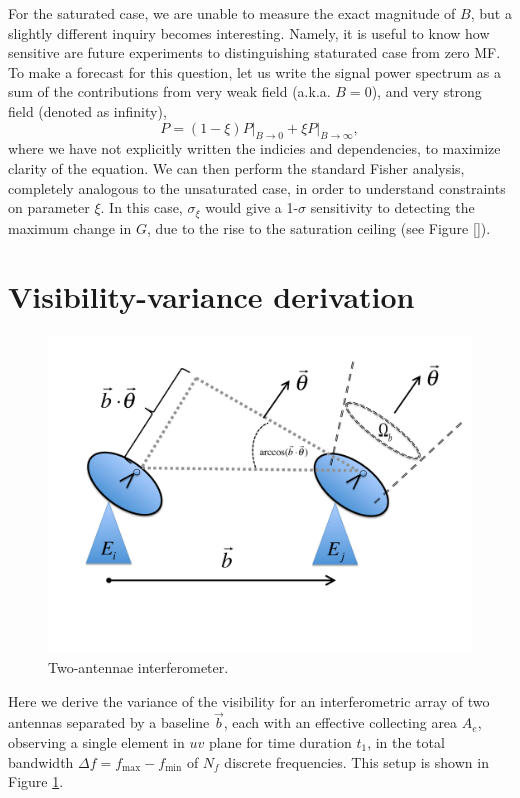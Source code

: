 \documentclass[12pt]{paper}
\newcommand{\beq}{\begin{equation}}
\newcommand{\eeq}{\end{equation}}
\begin{document}
For the saturated case, we are unable to measure the exact magnitude of $B$, but a slightly different inquiry becomes interesting. Namely, it is useful to know how sensitive are future experiments to distinguishing staturated case from zero MF. To make a forecast for this question, let us write the signal power spectrum as a sum of the contributions from very weak field (a.k.a. $B=0$), and very strong field (denoted as infinity), 
\beq
P = (1-\xi)P\bigg|_{B\to 0} + \xi P\bigg|_{B\to \infty},
\label{eq:saturated_P}
\eeq
where we have not explicitly written the indicies and dependencies, to maximize clarity of the equation. We can then perform the standard Fisher analysis, completely analogous to the unsaturated case, in order to understand constraints on parameter $\xi$. In this case, $\sigma_\xi$ would give a 1-$\sigma$ sensitivity to detecting the maximum change in $G$, due to the rise to the saturation ceiling (see Figure \ref{}). 

\appendix
\section{Visibility-variance derivation}
\label{app_Vrms}

\begin{figure}
\centering
\includegraphics[width=.5\textwidth,keepaspectratio=true]{2antennae.pdf}
\caption{Two-antennae interferometer.\label{fig:2antennae}}
\end{figure}

Here we derive the variance of the visibility for an interferometric array of two antennas separated by a baseline $\vec{b}$, each with an effective collecting area $A_e$, observing a single element in $uv$ plane for time duration $t_1$, in the total bandwidth $\Delta f = f_\text{max}-f_\text{min}$ of $N_f$ discrete frequencies. This setup is shown in Figure \ref{fig:2antennae}.
\end{document}
